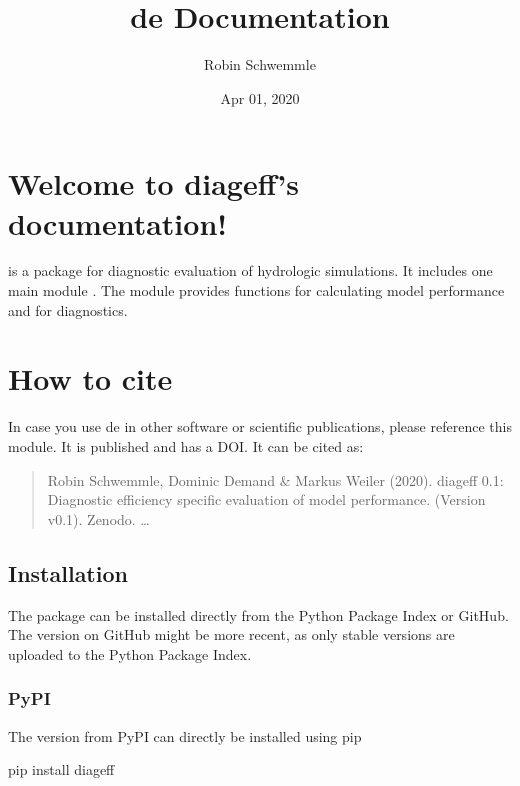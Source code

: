 \documentclass[letterpaper,10pt,english]{sphinxmanual}
\title{de Documentation}
\date{Apr 01, 2020}
\author{Robin Schwemmle}
\begin{document}
\pagestyle{empty}
\sphinxmaketitle
\pagestyle{plain}
\sphinxtableofcontents
\pagestyle{normal}
\label{\detokenize{index::doc}}



\chapter{Welcome to diag\sphinxhyphen{}eff’s documentation!}
\label{\detokenize{index:welcome-to-diag-eff-s-documentation}}
 is a package for diagnostic evaluation of hydrologic simulations. It
includes one main module . The module provides functions for calculating
model performance and for diagnostics.


\chapter{How to cite}
\label{\detokenize{index:how-to-cite}}
In case you use de in other software or scientific publications,
please reference this module. It is published and has a DOI. It can be cited
as:
\begin{quote}

Robin Schwemmle, Dominic Demand \& Markus Weiler (2020). diag\sphinxhyphen{}eff 0.1:
Diagnostic efficiency \textendash{} specific evaluation of model performance.
(Version v0.1). Zenodo. …
\end{quote}


\section{Installation}
\label{\detokenize{install:installation}}\label{\detokenize{install::doc}}
The package can be installed directly from the Python Package Index or GitHub.
The version on GitHub might be more recent, as only stable versions are
uploaded to the Python Package Index.


\subsection{PyPI}
\label{\detokenize{install:pypi}}
The version from PyPI can directly be installed using pip

\begin{sphinxVerbatim}[commandchars=\\\{\}]
pip install diag\PYGZhy{}eff
\end{sphinxVerbatim}
\end{document}
